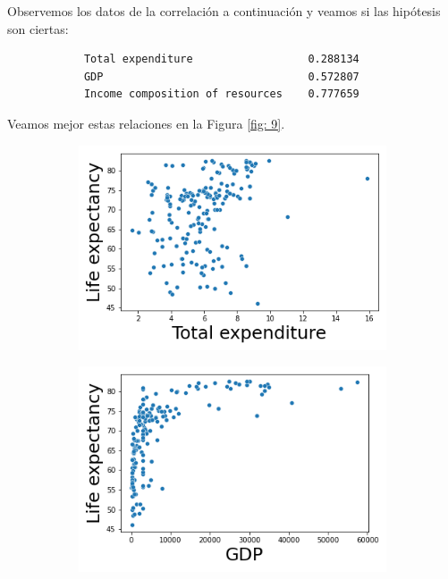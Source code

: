 \begin{itemize}
            Observemos los datos de la correlación a continuación y veamos si las hipótesis son ciertas:
            
             \begin{verbatim}
            Total expenditure                  0.288134
            GDP                                0.572807
            Income composition of resources    0.777659
       \end{verbatim}
       
       Veamos mejor estas relaciones en la Figura \ref{fig: 9}. 
       
       
               \begin{figure}[H]
              \centering
              \begin{subfigure}{0.3\linewidth}
                \centering
                \includegraphics[width=\textwidth]{img/19.png}
              \end{subfigure}
              \hfill
                \begin{subfigure}{0.3\linewidth}
                \centering
                \includegraphics[width=\textwidth]{img/20.png}

\end{subfigure}
\end{figure}
\end{itemize}
